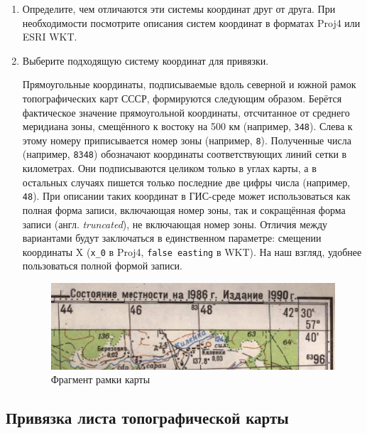 \documentclass[
  12pt,
]{book}
\begin{document}
\begin{enumerate}
\def\labelenumi{\arabic{enumi}.}
\setcounter{enumi}{4}
\item
  Определите, чем отличаются эти системы координат друг от друга. При необходимости посмотрите описания систем координат в форматах Proj4 или ESRI WKT.
\item
  Выберите подходящую систему координат для привязки.

  Прямоугольные координаты, подписываемые вдоль северной и южной рамок топографических карт СССР, формируются следующим образом. Берётся фактическое значение прямоугольной координаты, отсчитанное от среднего меридиана зоны, смещённого к востоку на 500 км (например, \texttt{348}). Слева к этому номеру приписывается номер зоны (например, \texttt{8}). Полученные числа (например, \texttt{8348}) обозначают координаты соответствующих линий сетки в километрах. Они подписываются целиком только в углах карты, а в остальных случаях пишется только последние две цифры числа (например, \texttt{48}). При описании таких координат в ГИС-среде может использоваться как полная форма записи, включающая номер зоны, так и сокращённая форма записи (англ. \emph{truncated}), не включающая номер зоны. Отличия между вариантами будут заключаться в единственном параметре: смещении координаты X (\texttt{x\_0} в Proj4, \texttt{false\ easting} в WKT). На наш взгляд, удобнее пользоваться полной формой записи.

  \begin{figure}
  \centering
  \includegraphics{images/Ex05_Reference/mapframe.png}
  \caption{Фрагмент рамки карты}
  \end{figure}
\end{enumerate}

\hypertarget{raster-reference-topomap}{%
\subsection{Привязка листа топографической карты}\label{raster-reference-topomap}}
\end{document}
